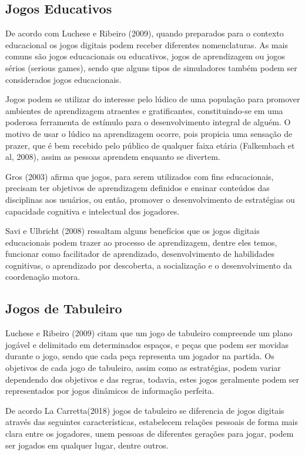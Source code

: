 \documentclass[12pt]{article}
\begin{document}
\subsection{Jogos Educativos}

De acordo com Luchese e Ribeiro (2009), quando preparados para o contexto educacional os jogos digitais podem receber diferentes nomenclaturas. As mais comuns são jogos educacionais ou educativos, jogos de aprendizagem ou jogos sérios (serious games), sendo que alguns tipos de simuladores também podem ser considerados jogos educacionais.

Jogos podem se utilizar do interesse pelo lúdico de uma população para promover ambientes de aprendizagem atraentes e gratificantes, constituindo-se em uma poderosa ferramenta de estímulo para o desenvolvimento integral de alguém. O motivo de usar o lúdico na aprendizagem ocorre, pois propicia uma sensação de prazer, que é bem recebido pelo público de qualquer faixa etária (Falkembach et al, 2008), assim as pessoas aprendem enquanto se divertem.

Gros (2003) afirma que jogos, para serem utilizados com fins educacionais, precisam ter objetivos de aprendizagem definidos e ensinar conteúdos das disciplinas aos usuários, ou então, promover o desenvolvimento de estratégias ou capacidade cognitiva e intelectual dos jogadores.

Savi e Ulbricht (2008) ressaltam alguns benefícios que os jogos digitais educacionais podem trazer ao processo de aprendizagem, dentre eles temos, funcionar como facilitador de aprendizado, desenvolvimento de habilidades cognitivas, o aprendizado por descoberta, a socialização e o desenvolvimento da coordenação motora.


\subsection{Jogos de Tabuleiro}

Luchese e Ribeiro (2009) citam que um jogo de tabuleiro compreende um plano jogável e delimitado em determinados espaços, e peças que podem ser movidas durante o jogo, sendo que cada peça representa um jogador na partida. Os objetivos de cada jogo de tabuleiro, assim como as estratégias, podem variar dependendo dos objetivos e das regras, todavia, estes jogos geralmente podem ser representados por jogos dinâmicos de informação perfeita.

De acordo La Carretta(2018) jogos de tabuleiro se diferencia de jogos digitais através das seguintes características, estabelecem relações pessoais de forma mais clara entre os jogadores, unem pessoas de diferentes gerações para jogar, podem ser jogados em qualquer lugar, dentre outros.
\end{document}
